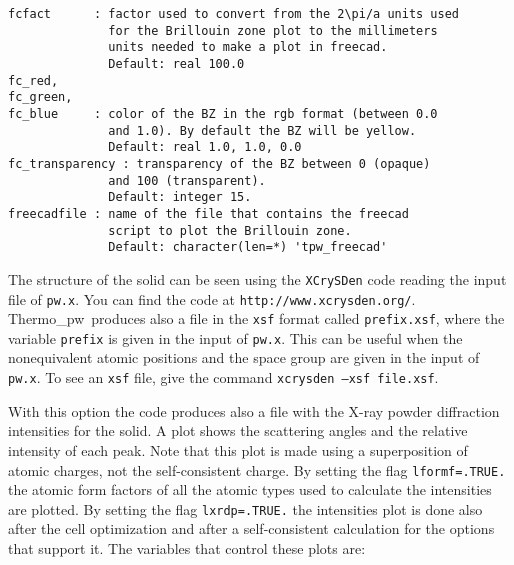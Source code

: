 \documentclass[12pt,a4paper,twoside]{report}
\def\thermo{{\sc Thermo\_pw}}
\begin{document}
\begin{verbatim}
fcfact      : factor used to convert from the 2\pi/a units used 
              for the Brillouin zone plot to the millimeters 
              units needed to make a plot in freecad. 
              Default: real 100.0
fc_red,     
fc_green,
fc_blue     : color of the BZ in the rgb format (between 0.0 
              and 1.0). By default the BZ will be yellow.
              Default: real 1.0, 1.0, 0.0
fc_transparency : transparency of the BZ between 0 (opaque) 
              and 100 (transparent).
              Default: integer 15.
freecadfile : name of the file that contains the freecad 
              script to plot the Brillouin zone.
              Default: character(len=*) 'tpw_freecad'
\end{verbatim}

The structure of the solid can be seen using the \texttt{XCrySDen} code
reading the input file of \texttt{pw.x}. You can find the code at
\texttt{http://www.xcrysden.org/}. \thermo\ produces also a file in the
\texttt{xsf} format called \texttt{prefix.xsf}, where the variable 
\texttt{prefix}
is given in the input of \texttt{pw.x}. This can be useful when
the nonequivalent atomic positions and the space group are given in the input
of \texttt{pw.x}. To see an \texttt{xsf} file, give the command
\texttt{xcrysden --xsf file.xsf}.

With this option the code produces also a file with the X-ray
powder diffraction intensities for the solid. A plot shows the 
scattering angles and the relative intensity of each peak. Note 
that this plot is made using 
a superposition of atomic charges, not the self-consistent charge.
By setting the flag \texttt{lformf=.TRUE.} the atomic form factors of all 
the atomic types used to calculate the intensities are plotted. 
By setting the flag \texttt{lxrdp=.TRUE.} the intensities plot is done also 
after the cell optimization and after a self-consistent calculation 
for the options that support it.
The variables that control these plots are:
\end{document}
